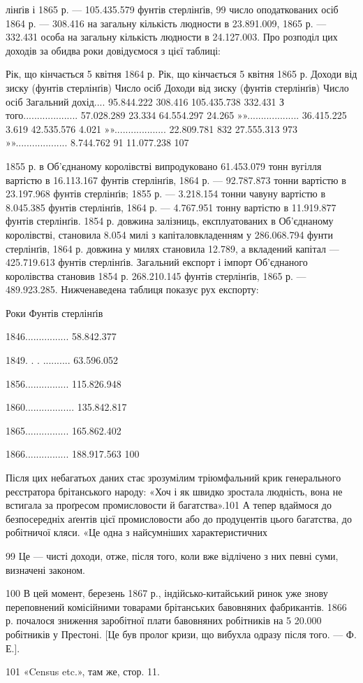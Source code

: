 лінґів і 1865 р. — 105.435.579 фунтів стерлінґів, 99 число оподаткованих
осіб 1864 р. — 308.416 на загальну кількість людности в
23.891.009, 1865 р. — 332.431 особа на загальну кількість людности
в 24.127.003. Про розподіл цих доходів за обидва роки
довідуємося з цієї таблиці:

    Рік, що кінчається 5 квітня 1864 р. Рік, що кінчається 5 квітня 1865 р.
    Доходи від зиску (фунтів стерлінґів) Число  осіб    Доходи від зиску (фунтів стерлінґів) Число 
осіб
Загальний дохід....  95.844.222   308.416   105.435.738   332.431
З того....................  57.028.289   23.334      64.554.297     24.265
»»...................  36.415.225   3.619        42.535.576     4.021
»»...................  22.809.781   832           27.555.313     973
»»...................  8.744.762      91             11.077.238     107

1855 р. в Об’єднаному королівстві випродуковано 61.453.079
тонн вугілля вартістю в 16.113.167 фунтів стерлінґів, 1864 р. —
92.787.873 тонни вартістю в 23.197.968 фунтів стерлінґів; 1855 р. —
3.218.154 тонни чавуну вартістю в 8.045.385 фунтів стерлінґів,
1864 р. — 4.767.951 тонну вартістю в 11.919.877 фунтів стерлінґів.
1854 р. довжина залізниць, експлуатованих в Об’єднаному
королівстві, становила 8.054 милі з капіталовкладенням
у 286.068.794 фунти стерлінґів, 1864 р. довжина у милях становила
12.789, а вкладений капітал — 425.719.613 фунтів стерлінґів.
Загальний експорт і імпорт Об’єднаного королівства
становив 1854 р. 268.210.145 фунтів стерлінґів, 1865 р. —
489.923.285. Нижченаведена таблиця показує рух експорту:

Роки    Фунтів стерлінґів

1846................ 58.842.377

1849. . . .......... 63.596.052

1856................ 115.826.948

1860.................. 135.842.817

1865................ 165.862.402

1866................ 188.917.563 100

Після цих небагатьох даних стає зрозумілим тріюмфальний
крик генерального реєстратора брітанського народу: «Хоч і
як швидко зростала людність, вона не встигала за проґресом промисловости
й багатства».101 А тепер вдаймося до безпосередніх
аґентів цієї промисловости або до продуцентів цього багатства,
до робітничої кляси. «Це одна з найсумніших характеристичних

99 Це — чисті доходи, отже, після того, коли вже відлічено з них
певні суми, визначені законом.

100    В цей момент, березень 1867 р., індійсько-китайський ринок
уже знову переповнений комісійними товарами брітанських бавовняних
фабрикантів. 1866 р. почалося зниження заробітної плати бавовняних
робітників на 5%
20.000 робітників у Престоні. [Це був пролог кризи, що вибухла одразу
після того. — Ф. Е.].

101 «Census etc.», там же, стор. 11.
